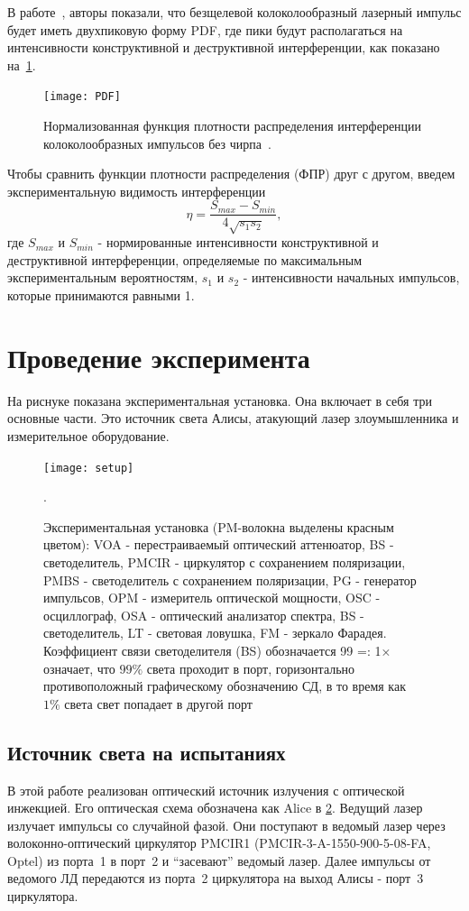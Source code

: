 В работе~\cite{shakhovoy2021}, авторы показали, что безщелевой колоколообразный лазерный импульс будет иметь двухпиковую форму PDF, где пики будут располагаться на интенсивности конструктивной и деструктивной интерференции, как показано на~\cref{fig:PDF}.
\begin{figure}
\texttt{[image: PDF]}
\caption{Нормализованная функция плотности распределения интерференции колоколообразных импульсов без чирпа~\cite{shakhovoy2021}.}
\label{fig:PDF}
\end{figure}
Чтобы сравнить функции плотности распределения (ФПР) друг с другом, введем экспериментальную видимость интерференции
\begin{equation}
\label{eq:visibility}
	\eta = {\frac{S_{max} - S_{min}}{4\sqrt{s_1 s_2}}},
\end{equation}
где $S_{max}$ и $S_{min}$ - нормированные интенсивности конструктивной и деструктивной интерференции, определяемые по максимальным экспериментальным вероятностям, $s_1$ и $s_2$ - интенсивности начальных импульсов, которые принимаются равными 1.
\section{Проведение эксперимента}
\label{sec:experiment} 

На риснуке  показана экспериментальная установка. Она включает в себя три основные части. Это источник света Алисы, атакующий лазер злоумышленника и измерительное оборудование.
\begin{figure}
\texttt{[image: setup]}
\caption{Экспериментальная установка (PM-волокна выделены красным цветом): VOA - перестраиваемый оптический аттенюатор, BS - светоделитель, PMCIR - циркулятор с сохранением поляризации, PMBS - светоделитель с сохранением поляризации, PG - генератор импульсов, OPM - измеритель оптической мощности, OSC - осциллограф, OSA - оптический анализатор спектра, BS - светоделитель, LT - световая ловушка, FM - зеркало Фарадея. Коэффициент связи светоделителя (BS) обозначается 99 =: 1× означает, что $99\%$ света проходит в порт, горизонтально противоположный графическому обозначению СД, в то время как $1\%$ света
свет попадает в другой порт}.
\label{fig:setup}
\end{figure}
\subsection{Источник света на испытаниях}

В этой работе реализован оптический источник излучения с оптической инжекцией. Его оптическая схема обозначена как Alice в \cref{fig:setup}. Ведущий лазер излучает  импульсы со случайной фазой. Они поступают в ведомый лазер через волоконно-оптический циркулятор PMCIR1 (PMCIR-3-A-1550-900-5-08-FA, Optel) из порта~1 в порт~2 и ``засевают'' ведомый лазер. Далее импульсы от ведомого ЛД передаются из порта~2 циркулятора на выход Алисы - порт~3 циркулятора.

